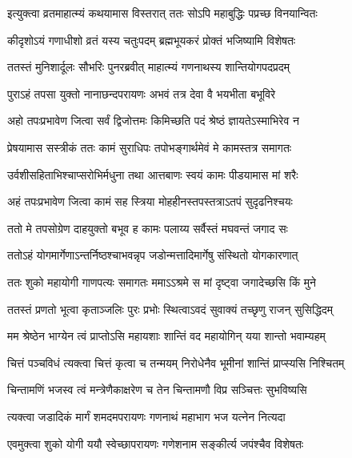 \twolineshloka
{इत्युक्त्वा व्रतमाहात्म्यं कथयामास विस्तरात्}
{ततः सोऽपि महाबुद्धिः पप्रच्छ विनयान्वितः} %


\twolineshloka
{कीदृशोऽयं गणाधीशो व्रतं यस्य चतुःपदम्}
{ब्रह्मभूयकरं प्रोक्तं भजिष्यामि विशेषतः} %

\twolineshloka
{ततस्तं मुनिशार्दूलः सौभरिः पुनरब्रवीत्}
{माहात्म्यं गणनाथस्य शान्तियोगपदप्रदम्} %


\twolineshloka
{पुराऽहं तपसा युक्तो नानाछन्दपरायणः}
{अभवं तत्र देवा वै भयभीता बभूविरे} %

\twolineshloka
{अहो तपःप्रभावेण जित्वा सर्वं द्विजोत्तमः}
{किमिच्छति पदं श्रेष्ठं ज्ञायतेऽस्माभिरेव न} %

\twolineshloka
{प्रेषयामास सस्त्रीकं ततः कामं सुराधिपः}
{तपोभङ्गार्थमेवं मे कामस्तत्र समागतः} %

\twolineshloka
{उर्वशीसहिताभिश्चाप्सरोभिर्मधुना तथा}
{आत्तबाणः स्वयं कामः पीडयामास मां शरैः} %

\twolineshloka
{अहं तपःप्रभावेण जित्वा कामं सह स्त्रिया}
{मोहहीनस्तपस्तत्राऽतपं सुदृढनिश्चयः} %

\twolineshloka
{ततो मे तपसोग्रेण दाहयुक्तो बभूव ह}
{कामः पलाय्य सर्वैस्तं मघवन्तं जगाद सः} %

\twolineshloka
{ततोऽहं योगमार्गेणाऽन्तर्निष्ठश्चाभवन्नृप}
{जडोन्मत्तादिमार्गेषु संस्थितो योगकारणात्} %

\twolineshloka
{ततः शुको महायोगी गाणपत्यः समागतः}
{ममाऽऽश्रमे स मां दृष्ट्वा जगादेच्छसि किं मुने} %

\twolineshloka
{ततस्तं प्रणतो भूत्वा कृताञ्जलिः पुरः प्रभोः}
{स्थित्वाऽवदं सुवाक्यं तच्छृणु राजन् सुसिद्धिदम्} %

\twolineshloka
{मम श्रेष्ठेन भाग्येन त्वं प्राप्तोऽसि महायशाः}
{शान्तिं वद महायोगिन् यया शान्तो भवाम्यहम्} %


\twolineshloka
{चित्तं पञ्चविधं त्यक्त्वा चित्तं कृत्वा च तन्मयम्}
{निरोधेनैव भूमीनां शान्तिं प्राप्स्यसि निश्चितम्} %

\twolineshloka
{चिन्तामणिं भजस्व त्वं मन्त्रेणैकाक्षरेण च}
{तेन चिन्तामणौ विप्र सञ्चित्तः सुभविष्यसि} %

\twolineshloka
{त्यक्त्वा जडादिकं मार्गं शमदमपरायणः}
{गणनाथं महाभाग भज यत्नेन नित्यदा} %

\twolineshloka
{एवमुक्त्वा शुको योगी ययौ स्वेच्छापरायणः}
{गणेशनाम सङ्कीर्त्य जपंश्चैव विशेषतः} %

